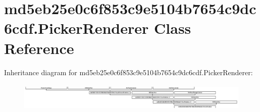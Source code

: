 \hypertarget{classmd5eb25e0c6f853c9e5104b7654c9dc6cdf_1_1PickerRenderer}{}\section{md5eb25e0c6f853c9e5104b7654c9dc6cdf.\+Picker\+Renderer Class Reference}
\label{classmd5eb25e0c6f853c9e5104b7654c9dc6cdf_1_1PickerRenderer}
Inheritance diagram for md5eb25e0c6f853c9e5104b7654c9dc6cdf.\+Picker\+Renderer\+:\begin{figure}[H]
\begin{center}
\leavevmode
\includegraphics[height=1.372549cm]{classmd5eb25e0c6f853c9e5104b7654c9dc6cdf_1_1PickerRenderer}
\end{center}
\end{figure}
